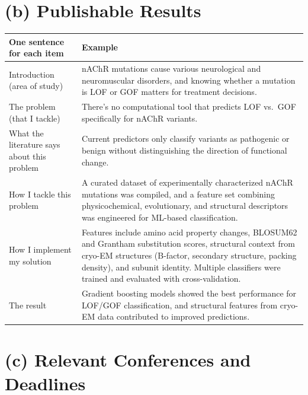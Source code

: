\documentclass[12pt,a4paper]{article}
\begin{document}
\newpage

\section*{(b) Publishable Results}

\begin{table}[h!]
\centering
\renewcommand{\arraystretch}{1.5}
\begin{tabularx}{\textwidth}{|L{3.5cm}|X|}
\hline
\textbf{One sentence for each item} & \textbf{Example} \\
\hline
Introduction (area of study) &
nAChR mutations cause various neurological and neuromuscular disorders, and knowing whether a mutation is LOF or GOF matters for treatment decisions. \\
\hline
The problem (that I tackle) &
There's no computational tool that predicts LOF vs.\ GOF specifically for nAChR variants. \\
\hline
What the literature says about this problem &
Current predictors only classify variants as pathogenic or benign without distinguishing the direction of functional change. \\
\hline
How I tackle this problem &
A curated dataset of experimentally characterized nAChR mutations was compiled, and a feature set combining physicochemical, evolutionary, and structural descriptors was engineered for ML-based classification. \\
\hline
How I implement my solution &
Features include amino acid property changes, BLOSUM62 and Grantham substitution scores, structural context from cryo-EM structures (B-factor, secondary structure, packing density), and subunit identity. Multiple classifiers were trained and evaluated with cross-validation. \\
\hline
The result &
Gradient boosting models showed the best performance for LOF/GOF classification, and structural features from cryo-EM data contributed to improved predictions. \\
\hline
\end{tabularx}
\end{table}

\newpage

\section*{(c) Relevant Conferences and Deadlines}
\end{document}
